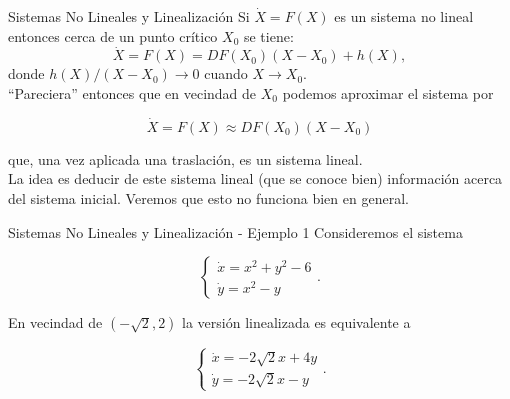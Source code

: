\documentclass{beamer}
\begin{document}
\begin{frame}{Sistemas No Lineales y Linealización}
Si $\dot{X} = F(X)$ es un sistema no lineal entonces cerca de un punto crítico $X_0$ se tiene:
$$ \dot{X} = F(X) = DF(X_0)(X-X_0) + h(X),$$
donde $h(X) / (X-X_0) \to 0$ cuando $X \to X_0$. \\
\pause
``Pareciera'' entonces que en vecindad de $X_0$ podemos aproximar el sistema por

$$ \dot{X} = F(X) \approx DF(X_0)(X-X_0)$$

que, una vez aplicada una traslación, es un sistema lineal.\\ \pause
La idea es deducir de este sistema lineal (que se conoce bien) información acerca del sistema inicial. Veremos que esto no funciona bien en general.
\end{frame}

\begin{frame}{Sistemas No Lineales y Linealización - Ejemplo 1}
Consideremos el sistema

$$ \left\{ \begin{array}{l} \dot{x} = x^2 + y^2 - 6 \\ \dot{y} = x^2 - y \end{array} \right.. $$

En vecindad de $(-\sqrt{2}, 2)$ la versión linealizada es equivalente a

$$ \left\{ \begin{array}{l} \dot{x} = -2\sqrt{2}x + 4y \\ \dot{y} = -2\sqrt{2}x - y \end{array} \right.. $$
\end{frame}
\end{document}
